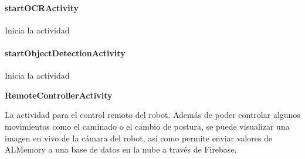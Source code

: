 \paragraph{startOCRActivity}
\label{\detokenize{dev_docs:startocractivity}}

\begin{fulllineitems}
\label{\detokenize{dev_docs:com.lar.cloudnao.MenuActivity.startOCRActivity()}}
Inicia la actividad {\hyperref[\detokenize{dev_docs:com.lar.cloudnao.OCRTranslationActivity}]{}}

\end{fulllineitems}



\paragraph{startObjectDetectionActivity}
\label{\detokenize{dev_docs:startobjectdetectionactivity}}

\begin{fulllineitems}
\label{\detokenize{dev_docs:com.lar.cloudnao.MenuActivity.startObjectDetectionActivity()}}
Inicia la actividad {\hyperref[\detokenize{dev_docs:com.lar.cloudnao.ObjectDetectionActivity}]{}}

\end{fulllineitems}



\textbf{RemoteControllerActivity}
\label{\detokenize{dev_docs:remotecontrolleractivity}}

\begin{fulllineitems}
\label{\detokenize{dev_docs:com.lar.cloudnao.RemoteControllerActivity}}
La actividad para el control remoto del robot. Además de poder controlar algunos movimientos como el caminado o el cambio de postura, se puede visualizar una imagen en vivo de la cámara del robot, así como permite enviar valores de ALMemory a una base de datos en la nube a través de Firebase.

\end{fulllineitems}



